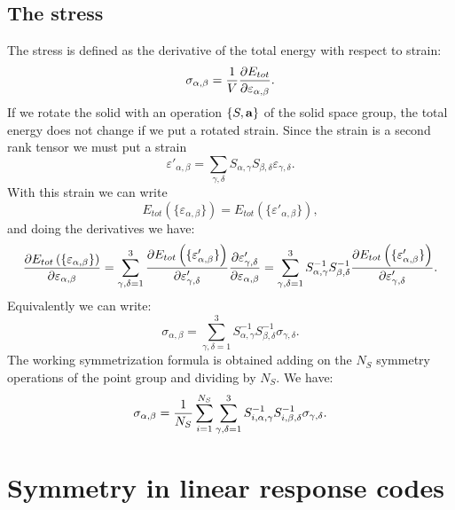 \documentclass[12pt,a4paper,twoside]{report}
\begin{document}
\section{The stress}
The stress is defined as the derivative of the total
energy with respect to strain:
\begin{equation}
\sigma_{\alpha,\beta} = {1\over V} {\partial E_{tot} \over \partial \varepsilon_{\alpha,\beta}}.
\end{equation}
If we rotate the solid with an operation $\{S,{\bf a}\}$ of the solid space group, the total energy does not change if we put a rotated strain. Since the strain is a second rank tensor we must put a strain
\begin{equation}
\varepsilon'_{\alpha,\beta}= \sum_{\gamma,\delta}S_{\alpha,\gamma} S_{\beta,\delta} \varepsilon_{\gamma,\delta}.
\end{equation}
With this strain we can write
\begin{equation}
E_{tot}\left(\{\varepsilon_{\alpha,\beta}\}\right) = 
E_{tot}\left(\{\varepsilon'_{\alpha,\beta}\}\right),
\end{equation}
and doing the derivatives we have:
\begin{equation}
{\partial E_{tot}\left(\{\varepsilon_{\alpha,\beta}\}\right) \over \partial \varepsilon_{\alpha,\beta}} =\sum_{\gamma,\delta=1}^3 {\partial 
E_{tot}\left(\{\varepsilon'_{\alpha,\beta}\}\right)
\over \partial \varepsilon'_{\gamma,\delta}} {\partial \varepsilon'_{\gamma,\delta} \over \partial \varepsilon_{\alpha,\beta}} = 
\sum_{\gamma,\delta=1}^3 S^{-1}_{\alpha,\gamma}
S^{-1}_{\beta,\delta}{\partial 
E_{tot}\left(\{\varepsilon'_{\alpha,\beta}\}\right)
\over \partial \varepsilon'_{\gamma,\delta}}. 
\end{equation}
Equivalently we can write:
\begin{equation}
\sigma_{\alpha,\beta}= 
\sum_{\gamma,\delta=1}^3 S^{-1}_{\alpha,\gamma}
S^{-1}_{\beta,\delta}
\sigma_{\gamma,\delta}.
\end{equation}
The working symmetrization formula is obtained adding on the $N_S$ symmetry operations of the point group
and dividing by $N_S$. We have:
\begin{equation}
\sigma_{\alpha,\beta}= {1 \over N_S} \sum_{i=1}^{N_S}
\sum_{\gamma,\delta=1}^3 S^{-1}_{i,\alpha,\gamma}
S^{-1}_{i,\beta,\delta}
\sigma_{\gamma,\delta}.
\label{symstress}
\end{equation}

{\color{dark-blue}\chapter{Symmetry in linear response codes}}
\color{black}
\end{document}
